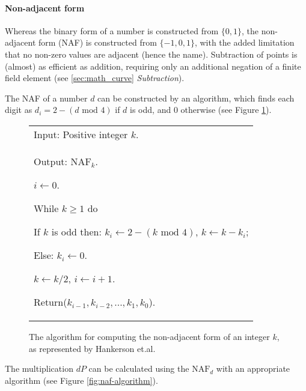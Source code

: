 \paragraph{Non-adjacent form}

Whereas the binary form of a number is constructed from \(\{0,1\}\), the non-adjacent form (NAF) is constructed from \(\{-1,0,1\}\), with
the added limitation that no non-zero values are adjacent (hence the name). Subtraction of points is (almost) as efficient as addition,
requiring only an additional negation of a finite field element (see \ref{sec:math_curve} \emph{Subtraction}).

The NAF of a number \(d\) can be constructed by an algorithm, which finds each digit as \(d_i = 2 - (d \text{ mod } 4)\) if \(d\) is odd, and
\(0\) otherwise (see Figure \ref{fig:compute-naf-algorithm}).

\begin{figure}[htb!]
	\centering
	\begin{tabular}{|p{\textwidth}|}
		\hline
		Input: Positive integer \(k\). \\
		Output: \(\text{NAF}_k\).

		\begin{enumerate*}
			\item \(i \gets 0\).
            \item While \(k \geq 1\) do
			\begin{enumerate*}
                \item If \(k\) is odd then: \(k_i \gets 2 - (k \text{ mod } 4)\), \(k \gets k - k_i\);
                \item Else: \(k_i \gets 0\).
                \item \(k \gets k/2\), \(i \gets i + 1\).
			\end{enumerate*}
			\item Return(\(k_{i-1}, k_{i-2}, ..., k_1, k_0\)).
		\end{enumerate*}
		\\
		\hline
	\end{tabular}
	\caption{The algorithm for computing the non-adjacent form of an integer \(k\), as represented by Hankerson et.al.\cite{hankerson2010}}
	\label{fig:compute-naf-algorithm}
\end{figure}

The multiplication \(dP\) can be calculated using the \(\text{NAF}_d\) with an appropriate algorithm (see Figure \ref{fig:naf-algorithm}).

